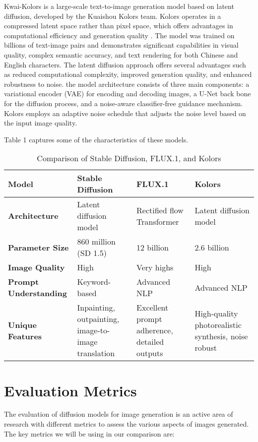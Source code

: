 \documentclass{article}
\begin{document}
Kwai-Kolors is a large-scale text-to-image generation model based on latent diffusion, developed by the Kuaishou Kolors team. 
Kolors operates in a compressed latent space rather than pixel space, 
which offers advantages in computational efficiency and generation quality \cite{kolors2024}. The model was trained on billions of text-image 
pairs and demonstrates significant capabilities in visual quality, complex semantic accuracy, and text rendering for both 
Chinese and English characters. The latent diffusion approach offers several advantages such as reduced computational complexity, improved 
generation quality, and enhanced robustness to noise. the model architecture consists of three main components: a variational encoder 
(VAE) for encoding and decoding images, a U-Net back bone for the diffusion process, and a noise-aware classifier-free guidance 
mechanism. Kolors employs an 
adaptive noise schedule that adjusts the noise level based on the input image quality.

Table 1 captures some of the characteristics of these models.

\begin{table}
  \centering
  \begin{tabular}{p{1.5in} p{1.5in} p{1.5in} p{1.5in}}
    \toprule
    \textbf{Model} & \textbf{Stable Diffusion} & \textbf{FLUX.1} & \textbf{Kolors} \\
    \midrule
    \textbf{Architecture} & Latent diffusion model & Rectified flow Transformer & Latent diffusion model \\
    \textbf{Parameter Size} & 860 million (SD 1.5) & 12 billion & 2.6 billion \\
    \textbf{Image Quality} & High & Very highs & High \\
    \textbf{Prompt Understanding} & Keyword-based & Advanced NLP & Advanced NLP \\
    \textbf{Unique Features} &
    Inpainting, outpainting, image-to-image translation & Excellent prompt adherence, detailed outputs & High-quality photorealistic synthesis, noise robust \\
    \bottomrule
  \end{tabular}
  \label{tab:comparison}
  \caption{Comparison of Stable Diffusion, FLUX.1, and Kolors}
\end{table}

\section{Evaluation Metrics}
The evaluation of diffusion models for image generation is an active area of research with different metrics to assess the various
aspects of images generated. The key metrics we will be using in our comparison are:
\end{document}
